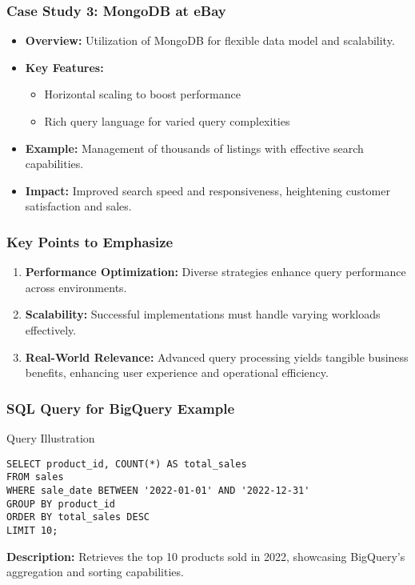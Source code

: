 \documentclass[aspectratio=169]{beamer}
\begin{document}
\begin{frame}
    \frametitle{Case Study 3: MongoDB at eBay}
    \begin{itemize}
        \item \textbf{Overview:} Utilization of MongoDB for flexible data model and scalability.
        \item \textbf{Key Features:}
        \begin{itemize}
            \item Horizontal scaling to boost performance
            \item Rich query language for varied query complexities
        \end{itemize}
        \item \textbf{Example:} Management of thousands of listings with effective search capabilities.
        \item \textbf{Impact:} Improved search speed and responsiveness, heightening customer satisfaction and sales.
    \end{itemize}
\end{frame}

\begin{frame}
    \frametitle{Key Points to Emphasize}
    \begin{enumerate}
        \item \textbf{Performance Optimization:} Diverse strategies enhance query performance across environments.
        \item \textbf{Scalability:} Successful implementations must handle varying workloads effectively.
        \item \textbf{Real-World Relevance:} Advanced query processing yields tangible business benefits, enhancing user experience and operational efficiency.
    \end{enumerate}
\end{frame}

\begin{frame}[fragile]
    \frametitle{SQL Query for BigQuery Example}
    \begin{block}{Query Illustration}
        \begin{lstlisting}
SELECT product_id, COUNT(*) AS total_sales 
FROM sales 
WHERE sale_date BETWEEN '2022-01-01' AND '2022-12-31' 
GROUP BY product_id 
ORDER BY total_sales DESC 
LIMIT 10;
        \end{lstlisting}
        \textbf{Description:} Retrieves the top 10 products sold in 2022, showcasing BigQuery's aggregation and sorting capabilities.
    \end{block}
\end{frame}
\end{document}
